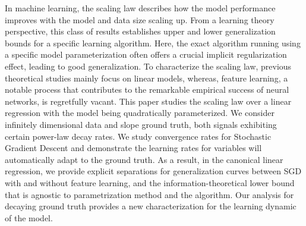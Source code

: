 In machine learning, the scaling law describes how the model performance improves with the model and data size scaling up. From a learning theory perspective, this class of results establishes upper and lower generalization bounds for a specific learning algorithm. Here,  %
the exact algorithm running using a specific model parameterization often offers a crucial implicit regularization effect, leading to good generalization.%
   To characterize the scaling law, previous theoretical studies mainly focus on linear models, whereas,  feature learning, a notable process that contributes to the remarkable empirical success of neural networks, is regretfully vacant.  This paper studies the scaling law over a linear regression with the model being quadratically parameterized. We  consider infinitely dimensional data and slope ground truth,  both signals exhibiting certain power-law decay rates. We study convergence rates for Stochastic Gradient Descent and  demonstrate the learning  rates for variables will automatically adapt to the ground truth.  As a result, in the canonical linear regression,  we provide explicit separations for generalization curves between  SGD with and without feature learning,  and the information-theoretical lower bound that is agnostic to parametrization method and the algorithm. Our analysis for decaying ground truth provides a new characterization for  
the learning dynamic of the %
model. 




